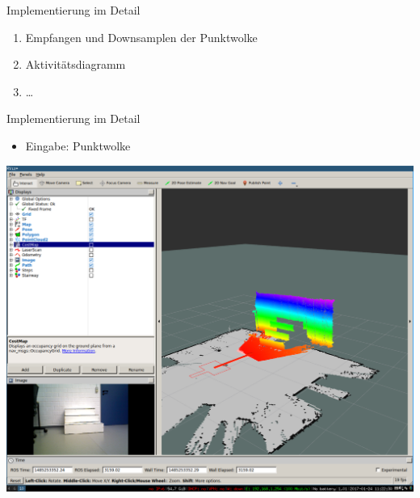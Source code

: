 \documentclass[18pt]{beamer}
\begin{document}
\begin{frame}{Implementierung im Detail}
	\begin{enumerate}
		\item Empfangen und Downsamplen der Punktwolke
		\item Aktivitätsdiagramm
		\item \dots
	\end{enumerate}
\end{frame}

\begin{frame}{Implementierung im Detail}
	\begin{itemize}
		\item Eingabe: Punktwolke
	\end{itemize}
	\begin{center}
		\includegraphics[scale=0.16]{images/ransac00.pdf}
	\end{center}
\end{frame}
\end{document}
